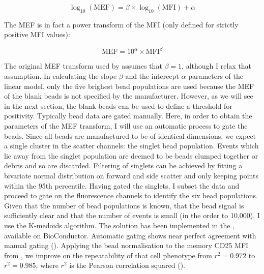 \begin{equation}
    \log_{10}(\text{MEF})=\beta \times \log_{10}(\text{MFI}) + \alpha
\label{equ:MEF}
\end{equation}

The MEF is in fact a power transform of the MFI (only defined for strictly positive MFI values):

\[
    \text{MEF}= 10^\alpha \times \text{MFI}^\beta
\]

The original MEF transform used by \citet{Dendrou:2009bl} assumes that $\beta=1$, although I relax that assumption.
In calculating the slope $\beta$ and the intercept $\alpha$ parameters of the linear model,
only the five brighest bead populations are used because the MEF of the blank beads is not specified by the manufacturer.
However, as we will see in the next section, the blank beads can be used to define a threshold for positivity.
Typically bead data are gated manually.
Here, in order to obtain the parameters of the MEF transform, I will use an automatic process to gate the beads.
Since all beads are manufactured to be of identical dimensions, we expect a single cluster in the scatter channels: the singlet bead population.
Events which lie away from the singlet population are deemed to be beads clumped together or debris and so are discarded.
Filtering of singlets can be achieved by fitting a bivariate normal distribution on forward and side scatter and only keeping
points within the 95th percentile.
Having gated the singlets, I subset the data and proceed to gate on the fluorescence channels to identify the six bead populations.
Given that the number of bead populations is known, that the bead signal is sufficiently clear and that the number of events is small (in the order to 10,000), I use the K-medoids algorithm.
The solution has been implemented in the , available on BioConductor.
Automatic gating shows near perfect agreement with manual gating ().
Applying the bead normalisation to the memory CD25 MFI from , we improve on the repeatability of that cell phenotype from $r^2=0.972$ to $r^2=0.985$, where $r^2$ is the Pearson correlation squared ().

